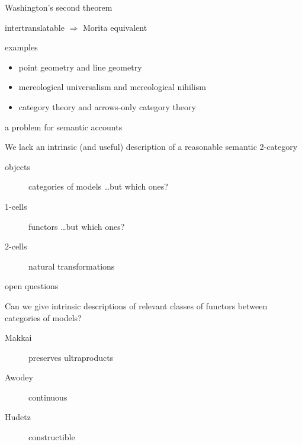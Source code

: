 \documentclass[17pt]{beamer}
\begin{document}
\begin{frame}{\small Washington's second theorem}

intertranslatable $\Longrightarrow$ Morita equivalent


\end{frame}


\begin{frame}{\small examples}

  \begin{itemize}
  \item point geometry and line geometry
  \item mereological universalism and mereological nihilism
  \item category theory and arrows-only category theory  
\end{itemize}

  
\end{frame}


\begin{frame}{\small a problem for semantic accounts}


  We lack an intrinsic (and useful) description of a reasonable 
 semantic 2-category

  \begin{description}
  \item[objects] categories of models \dots but which ones?
  \item[$1$-cells] functors \dots but which ones?
  \item[$2$-cells] natural transformations
    \end{description}

\end{frame}


\begin{frame}{\small open questions}
  
  Can we give intrinsic descriptions of relevant classes of functors
  between categories of models?

  \begin{description}
  \item[Makkai] preserves ultraproducts
  \item[Awodey] continuous  
  \item[Hudetz] constructible
  \end{description}



\end{frame}


\end{document}

